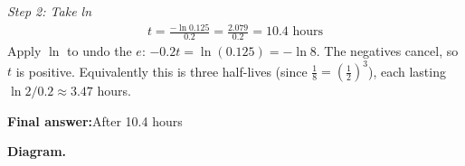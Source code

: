 \documentclass[11pt]{article}
\begin{document}
\textit{Step 2: Take ln}
\[\begin{gathered}
t = \frac{-\ln 0.125}{0.2} = \frac{2.079}{0.2} = 10.4 \text{ hours}
\end{gathered}\]
Apply \( \ln \) to undo the \( e \): \( -0.2t = \ln(0.125) = -\ln 8 \). The negatives cancel, so \( t \) is positive. Equivalently this is three half-lives (since \( \tfrac{1}{8} = \left(\tfrac{1}{2}\right)^3 \)), each lasting \( \ln 2 / 0.2 \approx 3.47 \) hours.

\begin{answerbox}
\textbf{Final answer:}\quad After 10.4 hours
\end{answerbox}
\textbf{Diagram.}

\begin{center}
\end{center}
\end{document}
